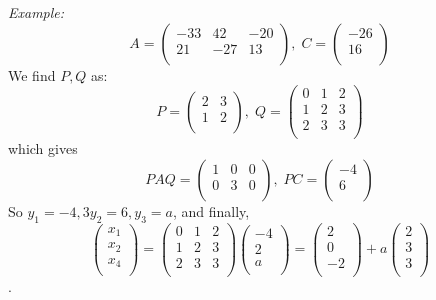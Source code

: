 \emph{Example:}
$$
A=
\left(
\begin{array}{ccc}
-33 & 42 & -20 \\
21 & -27 & 13\\
\end{array}
\right) , \;
C=
\left(
\begin{array}{c}
-26\\
16\\
\end{array}
\right)
$$
We find $P, Q$ as:
$$
P=
\left(
\begin{array}{cc}
2 & 3 \\
1 & 2 \\
\end{array}
\right) , \;
Q=
\left(
\begin{array}{ccc}
0 & 1 & 2\\
1 & 2& 3\\
2 & 3& 3\\
\end{array}
\right)
$$
which gives
$$
PAQ=
\left(
\begin{array}{ccc}
1 & 0 & 0\\
0 & 3 & 0\\
\end{array}
\right),\;
PC = 
\left(
\begin{array}{c}
-4\\
6\\
\end{array}
\right)
$$
So $y_1 = -4,3 y_2=6, y_3=a$, and finally,
$$
\left(
\begin{array}{c}
x_1\\
x_2\\
x_4\\
\end{array}
\right)
=
\left(
\begin{array}{ccc}
0 & 1 & 2\\
1 & 2& 3\\
2 & 3& 3\\
\end{array}
\right)
\left(
\begin{array}{c}
-4\\
2\\
a\\
\end{array}
\right) =
\left(
\begin{array}{c}
2\\
0\\
-2\\
\end{array}
\right) + a
\left(
\begin{array}{c}
2\\
3\\
3\\
\end{array}
\right)
$$.
